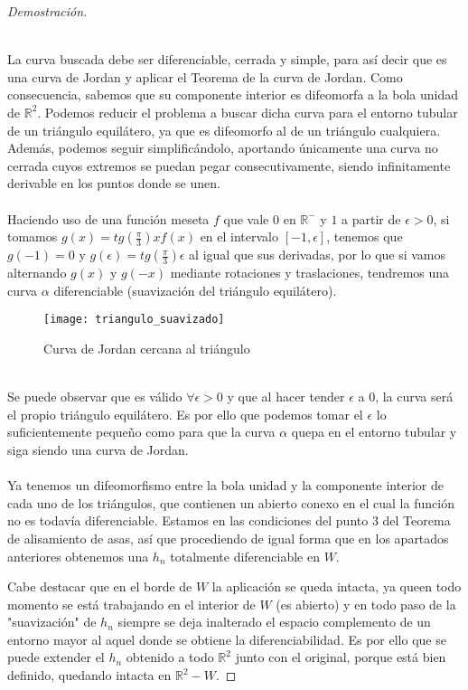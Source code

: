 \begin{proof}[Demostración]
\begin{enumerate}
			\\ La curva buscada debe ser diferenciable, cerrada y simple, para así decir que es una curva de Jordan y aplicar el Teorema de la curva de Jordan. Como consecuencia, sabemos que su componente interior es difeomorfa a la bola unidad de $\mathbb{R}^2$. Podemos reducir el problema a buscar dicha curva para el entorno tubular de un triángulo equilátero, ya que es difeomorfo al de un triángulo cualquiera. Además, podemos seguir simplificándolo, aportando únicamente una curva no cerrada cuyos extremos se puedan pegar consecutivamente, siendo infinitamente derivable en los puntos donde se unen.\\
			\\ Haciendo uso de una función meseta $f$ que vale $0$ en $\mathbb{R}^-$ y $1$ a partir de $\epsilon > 0$, si tomamos $g(x)=tg(\frac{\pi}{3})xf(x)$ en el intervalo $[-1,\epsilon]$, tenemos que $g(-1)=0$ y $g(\epsilon)=tg(\frac{\pi}{3})\epsilon$  al igual que sus derivadas, por lo que si vamos alternando $g(x)$ y $g(-x)$ mediante rotaciones y traslaciones, tendremos una curva $\alpha$ diferenciable (suavización del triángulo equilátero). \\
			\begin{figure}[h]
  				\centering
  				\texttt{[image: triangulo\_suavizado]}
  				\caption{Curva de Jordan cercana al triángulo}
  				\label{fig:triangulo_suavizado}
			\end{figure}
			\\ Se puede observar que es válido $\forall \epsilon > 0$ y que al hacer tender $\epsilon$ a $0$, la curva será el propio triángulo equilátero. Es por ello que podemos tomar el $\epsilon$ lo suficientemente pequeño como para que la curva $\alpha$ quepa en el entorno tubular y siga siendo una curva de Jordan. \\
			\\ Ya tenemos un difeomorfismo entre la bola unidad y la componente interior de cada uno de los triángulos, que contienen un abierto conexo en el cual la función no es todavía diferenciable. Estamos en las condiciones del punto 3 del Teorema de alisamiento de asas, así que procediendo de igual forma que en los apartados anteriores obtenemos una $h_n$ totalmente diferenciable en $W$.
		\end{enumerate}
		
		Cabe destacar que en el borde de $W$ la aplicación se queda intacta, ya queen todo momento se está trabajando en el interior de $W$ (es abierto) y en todo paso de la "suavización" de $h_n$ siempre se deja inalterado el espacio complemento de un entorno mayor al aquel donde se obtiene la diferenciabilidad. Es por ello que se puede extender el $h_n$ obtenido a todo $\mathbb{R}^2$ junto con el original, porque está bien definido, quedando intacta en $\mathbb{R}^2-W$. 
	\end{proof}

